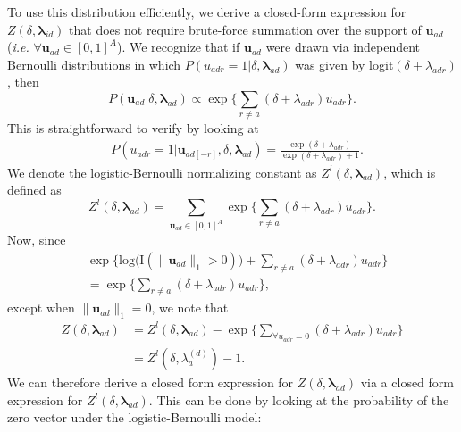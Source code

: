\documentclass[12pt]{article}
\begin{document}
\begin{appendices}
To use this distribution efficiently, we derive a closed-form expression for $Z(\delta,\boldsymbol{\lambda}_{id})$ that does not require brute-force summation over the support of $\boldsymbol{u}_{ad}$ (\textit{i.e.} $\forall \boldsymbol{u}_{ad} \in [0,1]^A$). We recognize that if $\boldsymbol{u}_{ad}$ were drawn via independent Bernoulli distributions in which $P({u}_{adr}=1|\delta, \boldsymbol{\lambda}_{ad})$ was given by logit$(\delta+\lambda_{adr})$, then 
\begin{equation*}
P(\boldsymbol{u}_{ad}|\delta, \boldsymbol{\lambda}_{ad}) \propto \exp\Big\{\sum_{r \neq a } (\delta+\lambda_{adr})u_{adr}\Big\}.  	 
\end{equation*}
This is straightforward to verify by looking at 
\begin{equation*}
\begin{aligned}
&P(u_{adr}=1|\boldsymbol{u}_{ad[-r]}, \delta, \boldsymbol{\lambda}_{ad})
=\frac{ \exp{(\delta+\lambda_{adr})}}{\exp{(\delta+\lambda_{adr})} + 1}.\end{aligned}\end{equation*}
We denote the logistic-Bernoulli normalizing constant as $Z^{l}(\delta,\boldsymbol{\lambda}_{ad})$, which is defined as 
\begin{equation*}
Z^{l}(\delta,\boldsymbol{\lambda}_{ad})=\sum_{\boldsymbol{u}_{ad} \in [0,1]^{A}} \exp\Big\{\sum_{r\neq a} (\delta+\lambda_{adr})u_{adr}\Big\}.
\end{equation*}
Now, since 
\begin{equation*}
\begin{aligned}
&\exp\Big\{ \mbox{log}\Big(\text{I}(\lVert \boldsymbol{u}_{ad} \rVert_1 > 0)\Big) + \sum_{r \neq a} (\delta+\lambda_{adr})u_{adr} \Big\}\\&= \exp\Big\{  \sum_{r \neq a} (\delta+\lambda_{adr})u_{adr} \Big\},
\end{aligned}
\end{equation*}
except when $\lVert \boldsymbol{u}_{ad} \rVert_1=0$, we note that 
\begin{equation*}
\begin{aligned}
Z(\delta,\boldsymbol{\lambda}_{ad})& = Z^{l}(\delta,\boldsymbol{\lambda}_{ad}) -\exp\Big\{ \sum\limits_{\forall u_{adr}=0}(\delta+\lambda_{adr})u_{adr} \Big\}
\\& = Z^{l}(\delta,\lambda_{a}^{(d)}) -  1.
\end{aligned}
\end{equation*}
We can therefore derive a closed form expression for $Z(\delta,\boldsymbol{\lambda}_{ad})$ via a closed form expression for $Z^{l}(\delta,\boldsymbol{\lambda}_{ad})$. This can be done by looking at the probability of the zero vector under the logistic-Bernoulli model:

\end{appendices}
\end{document}
